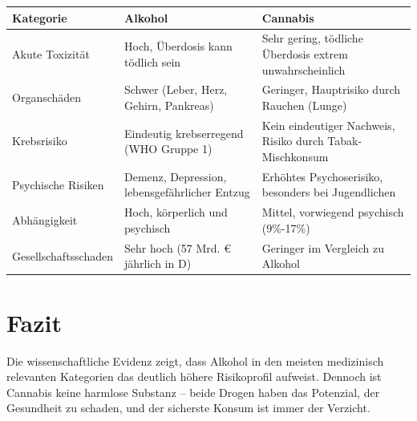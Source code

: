\documentclass[11pt,a4paper]{article}
\begin{document}
	\begin{table}[h!]
		\centering
		\small                     %
		\begin{tabularx}{\textwidth}{@{} l X X @{}}
			\toprule
			\textbf{Kategorie} & \textbf{Alkohol} & \textbf{Cannabis} \\ \midrule
			Akute Toxizität  & Hoch, Überdosis kann tödlich sein & Sehr gering, tödliche Überdosis extrem unwahrscheinlich\cite{nida-no-overdose} \\
			Organschäden      & Schwer (Leber, Herz, Gehirn, Pankreas) & Geringer, Hauptrisiko durch Rauchen (Lunge) \\
			Krebsrisiko       & Eindeutig krebserregend (WHO Gruppe 1)\cite{who-carcinogen} & Kein eindeutiger Nachweis, Risiko durch Tabak-Mischkonsum \\
			Psychische Risiken & Demenz, Depression, lebensgefährlicher Entzug & Erhöhtes Psychoserisiko, besonders bei Jugendlichen\cite{cannabis-psychosis} \\
			Abhängigkeit      & Hoch, körperlich und psychisch\cite{dhs-abhaengigkeit} & Mittel, vorwiegend psychisch (9\%-17\%)\cite{dhs-cannabis-abhaengigkeit} \\
			Gesellschaftsschaden & Sehr hoch (57 Mrd. € jährlich in D)\cite{dhs-costs} & Geringer im Vergleich zu Alkohol \\ \bottomrule
		\end{tabularx}
	\end{table}
	
	\section{Fazit}
	
	Die wissenschaftliche Evidenz zeigt, dass Alkohol in den meisten medizinisch relevanten Kategorien das deutlich höhere Risikoprofil aufweist. Dennoch ist Cannabis keine harmlose Substanz – beide Drogen haben das Potenzial, der Gesundheit zu schaden, und der sicherste Konsum ist immer der Verzicht.
	
\end{document}
